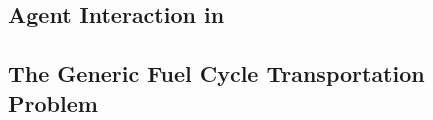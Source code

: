 


\subsection{Agent Interaction in \Cyclus}\label{sec:agent-interaction}


\subsection{The Generic Fuel Cycle Transportation Problem}\label{sec:gfctp}











